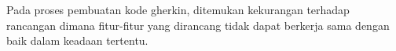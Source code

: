 Pada proses pembuatan kode gherkin, ditemukan kekurangan terhadap rancangan dimana fitur-fitur yang dirancang
tidak dapat berkerja sama dengan baik dalam keadaan tertentu.


